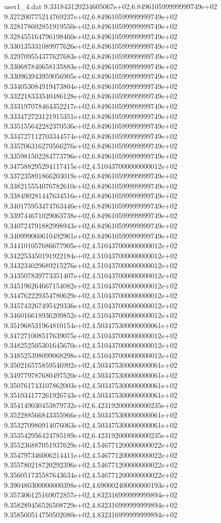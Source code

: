 \begin{filecontents}{user1_4.dat}
9.331843120234605067e+02,6.849610599999999749e+02
9.327200775214769237e+02,6.849610599999999749e+02
9.328178602851919550e+02,6.849610599999999749e+02
9.328455164796198460e+02,6.849610599999999749e+02
9.330135331089977626e+02,6.849610599999999749e+02
9.329709554377627683e+02,6.849610599999999749e+02
9.330687840658135883e+02,6.849610599999999749e+02
9.330963943959056905e+02,6.849610599999999749e+02
9.334053084919473804e+02,6.849610599999999749e+02
9.332218333540486128e+02,6.849610599999999749e+02
9.333197078464352217e+02,6.849610599999999749e+02
9.333472723121915351e+02,6.849610599999999749e+02
9.335155642282370536e+02,6.849610599999999749e+02
9.334727112703344574e+02,6.849610599999999749e+02
9.335706316270566276e+02,6.849610599999999749e+02
9.335981502284773796e+02,6.849610599999999749e+02
9.347588295294117415e+02,4.510437000000000012e+02
9.337235891866203019e+02,6.849610599999999749e+02
9.338215554076782610e+02,6.849610599999999749e+02
9.338490281447634516e+02,6.849610599999999749e+02
9.340175953474763446e+02,6.849610599999999749e+02
9.339744671029063738e+02,6.849610599999999749e+02
9.340724791882998943e+02,6.849610599999999749e+02
9.340999060610492961e+02,6.849610599999999749e+02
9.344101057686677905e+02,4.510437000000000012e+02
9.342253450191922184e+02,4.510437000000000012e+02
9.343234029689215276e+02,4.510437000000000012e+02
9.343507839773351407e+02,4.510437000000000012e+02
9.345196264667154082e+02,4.510437000000000012e+02
9.344762229354780629e+02,4.510437000000000012e+02
9.345743267495429336e+02,4.510437000000000012e+02
9.346016618936209852e+02,4.510437000000000012e+02
9.351968531964810154e+02,4.503475300000000061e+02
9.347271008517639075e+02,4.510437000000000012e+02
9.348252505301645670e+02,4.510437000000000012e+02
9.348525398099068298e+02,4.510437000000000012e+02
9.350216575859546992e+02,4.503475300000000061e+02
9.349779787680497520e+02,4.503475300000000061e+02
9.350761743107862003e+02,4.503475300000000061e+02
9.351034177261926743e+02,4.503475300000000061e+02
9.354149030453879732e+02,6.423192000000000235e+02
9.352288566843355966e+02,4.503475300000000061e+02
9.353270980914076063e+02,4.503475300000000061e+02
9.353542956424785189e+02,6.423192000000000235e+02
9.355236887051937629e+02,4.546771200000000022e+02
9.354797346006214411e+02,4.546771200000000022e+02
9.355780218720292396e+02,4.546771200000000022e+02
9.356051735587643634e+02,4.546771200000000022e+02
9.390480300000000398e+02,4.690002400000000193e+02
9.357306125169072857e+02,4.832316999999999894e+02
9.358289456526508729e+02,4.832316999999999894e+02
9.358560514750502080e+02,4.832316999999999894e+02

\end{filecontents}
